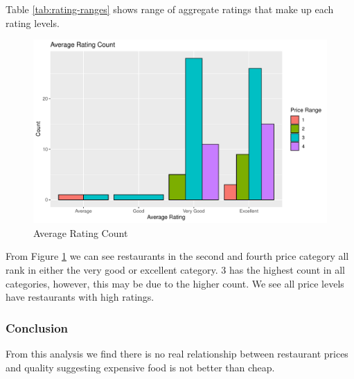 \documentclass[11pt,a4paper,]{article}
\begin{document}
Table \ref{tab:rating-ranges} shows range of aggregate ratings that make up each rating levels.

\begin{figure}
\centering
\includegraphics{assignment4_files/figure-latex/rating-count-1.pdf}
\caption{\label{fig:rating-count}Average Rating Count}
\end{figure}

From Figure \ref{fig:rating-count} we can see restaurants in the second and fourth price category all rank in either the very good or excellent category. 3 has the highest count in all categories, however, this may be due to the higher count. We see all price levels have restaurants with high ratings.

\hypertarget{conclusion}{%
\subsubsection{Conclusion}\label{conclusion}}

From this analysis we find there is no real relationship between restaurant prices and quality suggesting expensive food is not better than cheap.

\printbibliography
\end{document}
